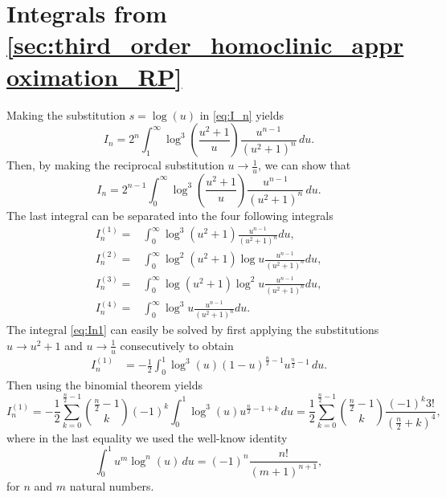 \section[Integrals from section 2.3.1]{Integrals from
\texorpdfstring{\cref{sec:third_order_homoclinic_approximation_RP}}{subsection 2.3.1}}%
\label{sec:I_n}
Making the substitution $s=\log(u)$ in \cref{eq:I_n} yields
\begin{equation*}
    I_n = 2^n \int_1^\infty \log^3\left(\frac{u^2+1}{u}\right) \frac{u^{n-1}}{(u^2+1)^n} \, du.
\end{equation*}
Then, by making the reciprocal substitution $u \to \frac{1}{u}$, we can show
that
\begin{equation*}
    I_n = 2^{n-1} \int_0^\infty \log^3\left(\frac{u^2+1}{u}\right)
            \frac{u^{n-1}}{(u^2+1)^n} \, du.
\end{equation*}
The last integral can be separated into the four following integrals
\begin{align}
    I_n^{(1)} =& \int_0^\infty \log^3(u^2+1) \frac{u^{n-1}}{(u^2+1)^n} du
              \label{eq:In1}, \\
    I_n^{(2)} =& \int_0^\infty \log^2(u^2+1)\log u \frac{u^{n-1}}{(u^2+1)^n} du 
              \label{eq:In2}, \\
    I_n^{(3)} =& \int_0^\infty \log(u^2+1)\log^2 u \frac{u^{n-1}}{(u^2+1)^n} du 
              \label{eq:In3}, \\
    I_n^{(4)} =& \int_0^\infty \log^3 u \frac{u^{n-1}}{(u^2+1)^n} du
              \label{eq:In4}.
\end{align}
The integral \cref{eq:In1} can easily be solved by first applying the
substitutions $u\to u^2+1$ and $u\to\frac1u$ consecutively to obtain
\begin{align*}
    I_n^{(1)} 
    &{}= - \frac12 \int_0^1 \log^3 (u) 
        \left(1-u\right)^{\frac{n}{2}-1}u^{\frac{n}{2}-1} \, du.
\end{align*}
Then using the binomial theorem yields
\begin{equation*}
    I_n^{(1)} 
= - \frac12 \sum_{k=0}^{\frac{n}{2}-1} \binom{\frac{n}{2}-1}k (-1)^k 
            \int_0^1 \log^3 (u) u^{\frac{n}{2}-1+k} \, du
    = \frac12 \sum_{k=0}^{\frac{n}{2}-1} \binom{\frac{n}{2}-1}k
    \frac{(-1)^k 3!}{({\frac{n}{2}+k})^4},
\end{equation*}
where in the last equality we used the well-know identity
\begin{equation}
    \label{eq:int01umlogn}
    \int_0^1 u^m \log^n (u) \, du = (-1)^n \frac{n!}{(m+1)^{n+1}},
\end{equation}
for $n$ and $m$ natural numbers.

